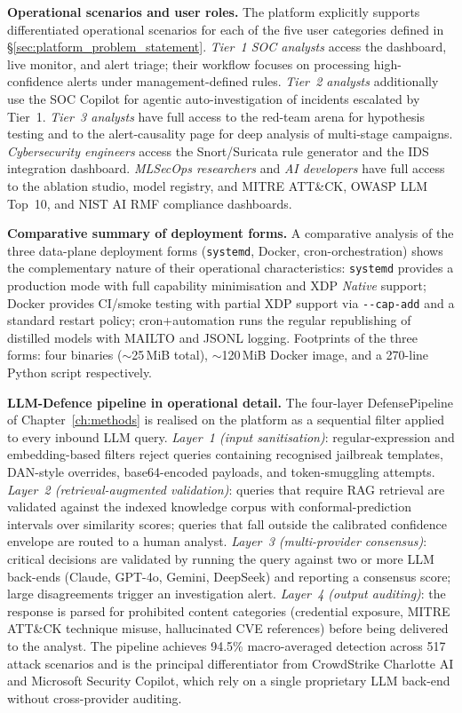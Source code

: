 \noindent\textbf{Operational scenarios and user roles.} The platform explicitly supports differentiated operational scenarios for each of the five user categories defined in \S\ref{sec:platform_problem_statement}. \emph{Tier~1 SOC analysts} access the dashboard, live monitor, and alert triage; their workflow focuses on processing high-confidence alerts under management-defined rules. \emph{Tier~2 analysts} additionally use the SOC Copilot for agentic auto-investigation of incidents escalated by Tier~1. \emph{Tier~3 analysts} have full access to the red-team arena for hypothesis testing and to the alert-causality page for deep analysis of multi-stage campaigns. \emph{Cybersecurity engineers} access the Snort/Suricata rule generator and the IDS integration dashboard. \emph{MLSecOps researchers} and \emph{AI developers} have full access to the ablation studio, model registry, and MITRE ATT\&CK, OWASP LLM Top~10, and NIST AI RMF compliance dashboards.

\noindent\textbf{Comparative summary of deployment forms.} A comparative analysis of the three data-plane deployment forms (\texttt{systemd}, Docker, cron-orchestration) shows the complementary nature of their operational characteristics: \texttt{systemd} provides a production mode with full capability minimisation and XDP \emph{Native} support; Docker provides CI/smoke testing with partial XDP support via \texttt{-{}-cap-add} and a standard restart policy; cron+automation runs the regular republishing of distilled models with MAILTO and JSONL logging. Footprints of the three forms: four binaries ($\sim$25\,MiB total), $\sim$120\,MiB Docker image, and a 270-line Python script respectively.

\noindent\textbf{LLM-Defence pipeline in operational detail.} The four-layer DefensePipeline of Chapter~\ref{ch:methods} is realised on the platform as a sequential filter applied to every inbound LLM query. \emph{Layer~1 (input sanitisation)}: regular-expression and embedding-based filters reject queries containing recognised jailbreak templates, DAN-style overrides, base64-encoded payloads, and token-smuggling attempts. \emph{Layer~2 (retrieval-augmented validation)}: queries that require RAG retrieval are validated against the indexed knowledge corpus with conformal-prediction intervals over similarity scores; queries that fall outside the calibrated confidence envelope are routed to a human analyst. \emph{Layer~3 (multi-provider consensus)}: critical decisions are validated by running the query against two or more LLM back-ends (Claude, GPT-4o, Gemini, DeepSeek) and reporting a consensus score; large disagreements trigger an investigation alert. \emph{Layer~4 (output auditing)}: the response is parsed for prohibited content categories (credential exposure, MITRE ATT\&CK technique misuse, hallucinated CVE references) before being delivered to the analyst. The pipeline achieves 94.5\% macro-averaged detection across 517 attack scenarios and is the principal differentiator from CrowdStrike Charlotte AI and Microsoft Security Copilot, which rely on a single proprietary LLM back-end without cross-provider auditing.

